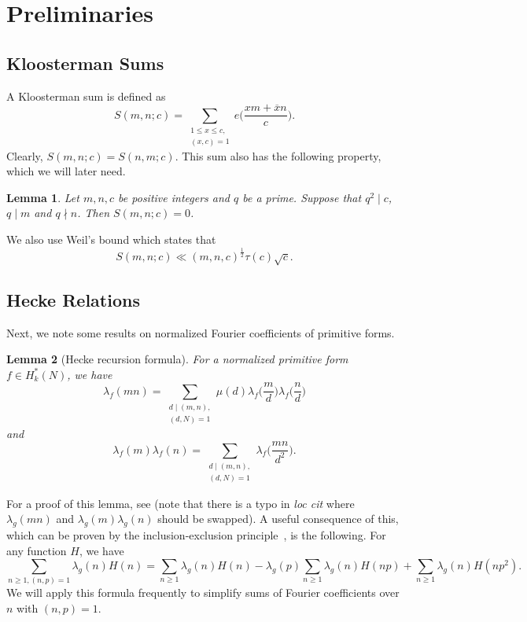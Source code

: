 \documentclass[12pt]{amsart}
\theoremstyle{plain}
\newtheorem{lem}{Lemma}[subsection]
\theoremstyle{definition}
\begin{document}

\section{Preliminaries}
\subsection{Kloosterman Sums} A Kloosterman sum is defined as
    \begin{equation}\label{eqn:kloosterman}
    S(m, n ; c) = \sum_{\substack{1\leq x \leq c, \\ (x, c)=1}} e\Big(\frac{xm+\overline{x}n}{c}\Big) .
    \end{equation}
Clearly, $S(m, n ; c)= S(n, m ; c)$. This sum also has the following property, which we will later need.


\begin{lem}{\cite[Lemma A.12]{Royer}}\label{Kloosterman vanishes}
Let $m, n, c$ be positive integers and $q$ be a prime. Suppose that $q^2 \mid c$, $q\mid m$ and $q \nmid n$. Then $S(m, n; c)=0$.
\end{lem}
We also use Weil's bound which states that
\begin{equation}\label{eqn:weil-bound} 
S(m, n; c) \ll 
(m, n, c)^{\frac12} \tau(c) \sqrt{c}.
\end{equation}

\subsection{Hecke Relations} Next, we note some results on normalized Fourier coefficients of primitive forms. 


\begin{lem}[Hecke recursion formula]\label{Hecke relation}
For a normalized primitive form $f\in H^*_{k}(N)$, we have
    \[
    \lambda_f(mn)= \sum_{\substack{d\mid (m, n), \\ (d, N)=1}} \mu(d) 
    \lambda_f\Big(\frac{m}{d}\Big) \lambda_f\Big(\frac{n}{d}\Big)
    \]
and
    \[
    \lambda_f(m) \lambda_f(n)= \sum_{\substack{d\mid (m, n), \\ (d, N)=1}}
    \lambda_f\Big(\frac{mn}{d^2}\Big).
    \]
\end{lem}


For a proof of this lemma, see \cite[(14.50) and (14.51)]{IK} (note that there is a typo in \textit{loc cit} where $\lambda_g(mn)$ and $\lambda_g(m) \lambda_g(n)$ should be swapped). A useful consequence of this, which can be proven by the inclusion-exclusion principle~\cite[p. 135]{Balkanova}, is the following. For any function $H$, we have
    \begin{equation}\label{eq:n p rel prime}
    \sum_{n\geq 1, (n, p)=1} \lambda_g(n) H(n)
    =\sum_{n\geq 1} \lambda_g(n) H(n) 
    -\lambda_g(p) \sum_{n\geq 1} \lambda_g(n) H(np)
    + \sum_{n\geq 1} \lambda_g(n) H(np^2).
    \end{equation}
We will apply this formula frequently to simplify sums of Fourier coefficients over $n$ with $(n, p)=1$. 
\end{document}
